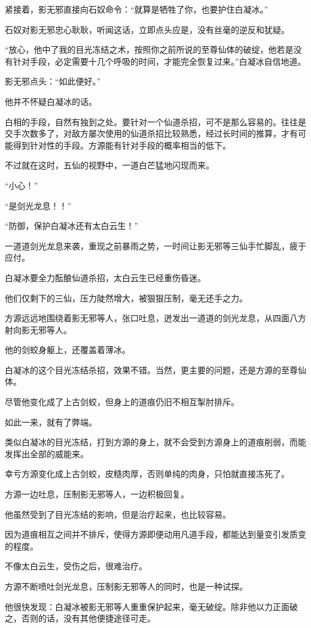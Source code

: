 \begin{this_body}
紧接着，影无邪直接向石奴命令：“就算是牺牲了你，也要护住白凝冰。”

石奴对影无邪忠心耿耿，听闻这话，立即点头应是，没有丝毫的逆反和犹疑。

“放心，他中了我的目光冻结之术，按照你之前所说的至尊仙体的破绽，他若是没有针对手段，必定需要十几个呼吸的时间，才能完全恢复过来。”白凝冰自信地道。

影无邪点头：“如此便好。”

他并不怀疑白凝冰的话。

白相的手段，自然有独到之处。要针对一个仙道杀招，可不是那么容易的。往往是交手次数多了，对敌方屡次使用的仙道杀招比较熟悉，经过长时间的推算，才有可能得到针对性的手段。方源能有针对手段的概率相当的低下。

不过就在这时，五仙的视野中，一道白芒猛地闪现而来。

“小心！”

“是剑光龙息！！”

“防御，保护白凝冰还有太白云生！”

一道道剑光龙息来袭，重现之前暴雨之势，一时间让影无邪等三仙手忙脚乱，疲于应付。

白凝冰要全力酝酿仙道杀招，太白云生已经重伤昏迷。

他们仅剩下的三仙，压力陡然增大，被狠狠压制，毫无还手之力。

方源远远地围绕着影无邪等人，张口吐息，迸发出一道道的剑光龙息，从四面八方射向影无邪等人。

他的剑蛟身躯上，还覆盖着薄冰。

白凝冰的这个目光冻结杀招，效果不错。当然，更主要的问题，还是方源的至尊仙体。

尽管他变化成了上古剑蛟，但身上的道痕仍旧不相互掣肘排斥。

如此一来，就有了弊端。

类似白凝冰的目光冻结，打到方源的身上，就不会受到方源身上的道痕削弱，而能发挥出全部的威能来。

幸亏方源变化成上古剑蛟，皮糙肉厚，否则单纯的肉身，只怕就直接冻死了。

方源一边吐息，压制影无邪等人，一边积极回复。

他虽然受到了目光冻结的影响，但是治疗起来，也比较容易。

因为道痕相互之间并不排斥，使得方源即便动用凡道手段，都能达到量变引发质变的程度。

不像太白云生，受伤之后，很难治疗。

方源不断喷吐剑光龙息，压制影无邪等人的同时，也是一种试探。

他很快发现：白凝冰被影无邪等人重重保护起来，毫无破绽。除非他以力正面破之，否则的话，没有其他便捷途径可走。


\end{this_body}
